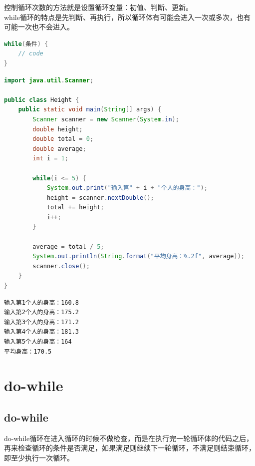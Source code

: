 控制循环次数的方法就是设置循环变量：初值、判断、更新。\\

while循环的特点是先判断、再执行，所以循环体有可能会进入一次或多次，也有可能一次也不会进入。

\vspace{-0.5cm}

\begin{lstlisting}[language=Java]
while(条件) {
    // code
}
\end{lstlisting}

\vspace{0.5cm}


\begin{lstlisting}[language=Java]
import java.util.Scanner;

public class Height {
    public static void main(String[] args) {
        Scanner scanner = new Scanner(System.in);
        double height;
        double total = 0;
        double average;
        int i = 1;
        
        while(i <= 5) {
            System.out.print("输入第" + i + "个人的身高：");
            height = scanner.nextDouble();
            total += height;
            i++;
        }
        
        average = total / 5;
        System.out.println(String.format("平均身高：%.2f", average));
        scanner.close();
    }
}
\end{lstlisting}

\begin{tcolorbox}
\begin{verbatim}
输入第1个人的身高：160.8
输入第2个人的身高：175.2
输入第3个人的身高：171.2
输入第4个人的身高：181.3
输入第5个人的身高：164
平均身高：170.5
\end{verbatim}
\end{tcolorbox}

\newpage

\section{do-while}

\subsection{do-while}

do-while循环在进入循环的时候不做检查，而是在执行完一轮循环体的代码之后，再来检查循环的条件是否满足，如果满足则继续下一轮循环，不满足则结束循环，即至少执行一次循环。\\

